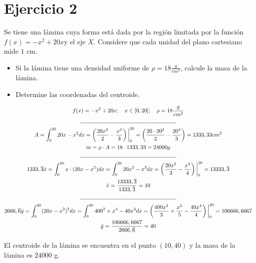 \section*{Ejercicio 2}
\noindent Se tiene una lámina cuya forma está dada por la región limitada por la función \(f(x) = -x^2 + 20x\)y el eje
\(X\). Considere que cada unidad del plano cartesiano mide \(1\) cm.
\begin{itemize}
  \item Si la lámina tiene una densidad uniforme de \(\rho = 18 \frac{g}{cm^2}\), calcule la masa de la lámina.
  \item Determine las coordenadas del centroide.
\end{itemize}

\begin{gather*}
  f(x) = -x^2 + 20x; \quad x \in [0, 20]; \quad \rho = 18 \frac{g}{cm^2} \\
  \rule{0.5\textwidth}{0.4pt} \\
  A = \int_{0}^{20} 20x - x^2 dx %
    = \left(\frac{20x^2}{2} - \frac{x^3}{3}\right)\bigg|_{0}^{20} %
    = \left(\frac{20 \cdot 20^2}{2} - \frac{20^3}{3}\right) %
    = 1333,33 cm^2 \\
  m = \rho \cdot A = 18 \cdot 1333,33 = 24000 g \\
  \rule{0.5\textwidth}{0.4pt} \\
  1333,\overline{3}\bar{x} = \int_{0}^{20} x \cdot (20x - x^2) dx %
    = \int_{0}^{20} 20x^2 - x^3 dx %
    = \left(\frac{20x^3}{3} - \frac{x^4}{4}\right)\bigg|_{0}^{20} %
    = 13333,\overline{3} \\
  \bar{x} = \frac{13333,\overline{3}}{1333,\overline{3}} = 10 \\
  \rule{0.5\textwidth}{0.4pt} \\
  2666,\overline{6}\bar{y} = \int_{0}^{20} (20x - x^2)^2 dx %
    = \int_{0}^{20} 400^2 + x^4 - 40x^3 dx %
    = \left(\frac{400x^3}{3} + \frac{x^5}{5} - \frac{40x^4}{4}\right) \bigg|_{0}^{20} %
    = 106666,6667 \\
  \bar{y} = \frac{106666,6667}{2666,\overline{6}} = 40
\end{gather*}

\noindent El centroide de la lámina se encuentra en el punto \((10, 40)\) y la masa de la lámina es \(24000\) g.